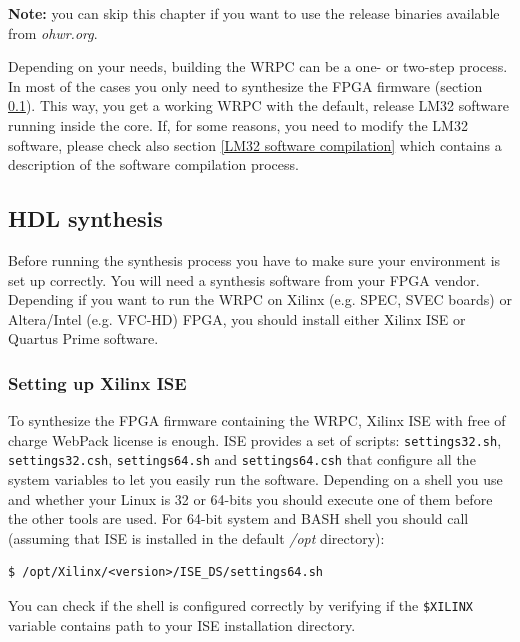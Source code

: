 \documentclass[a4paper, 12pt]{article}
\begin{document}
\textbf{Note:} you can skip this chapter if you want to use the release binaries
available from \textit{ohwr.org}.

\vspace{1em}
Depending on your needs, building the WRPC can be a one- or two-step process.
In most of the cases you only need to synthesize the FPGA firmware (section
\ref{HDL synthesis}). This way, you get a working WRPC with the default, release
LM32 software running inside the core. If, for some reasons, you need to modify
the LM32 software, please check also section \ref{LM32 software compilation}
which contains a description of the software compilation process.

\subsection{HDL synthesis}
\label{HDL synthesis}

Before running the synthesis process you have to make sure your environment is
set up correctly. You will need a synthesis software from your FPGA vendor.
Depending if you want to run the WRPC on Xilinx (e.g. SPEC, SVEC boards) or
Altera/Intel (e.g. VFC-HD) FPGA, you should install either Xilinx ISE or Quartus
Prime software.

\subsubsection{Setting up Xilinx ISE}
\label{Setting up Xilinx ISE}
To synthesize the FPGA firmware containing the WRPC, Xilinx ISE with free of
charge WebPack license is enough. ISE provides a set of scripts:
\texttt{settings32.sh}, \texttt{settings32.csh}, \texttt{settings64.sh} and
\texttt{settings64.csh} that configure all the system variables to let you
easily run the software. Depending on a shell you use and whether your Linux is
32 or 64-bits you should execute one of them before the other tools are used.
For 64-bit system and BASH shell you should call (assuming that ISE is installed
in the default \textit{/opt} directory):
\begin{lstlisting}
$ /opt/Xilinx/<version>/ISE_DS/settings64.sh
\end{lstlisting}

You can check if the shell is configured correctly by verifying if the
\texttt{\$XILINX} variable contains path to your ISE installation directory.
\end{document}
